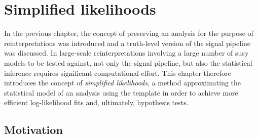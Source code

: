 


\chapter{Simplified likelihoods}\label{ch:simplify}

\ifpdf
    \graphicspath{{chapter-simplify/Figs/Raster/}{chapter-simplify/Figs/PDF/}{chapter-simplify/Figs/}}
\else
    \graphicspath{{chapter-simplify/Figs/Vector/}{chapter-simplify/Figs/}}
\fi

In the previous chapter, the concept of preserving an analysis for the purpose of reinterpretations was introduced and a truth-level version of the signal pipeline was discussed. In large-scale reinterpretations involving a large number of \gls{susy} models to be tested against, not only the signal pipeline, but also the statistical inference requires significant computational effort. 
This chapter therefore introduces the concept of \textit{simplified likelihoods}, a method approximating the statistical model of an analysis using the  template in order to achieve more efficient log-likelihood fits and, ultimately, hypothesis tests.

\section{Motivation}\label{sec:simplified_likelihood_motivation}

